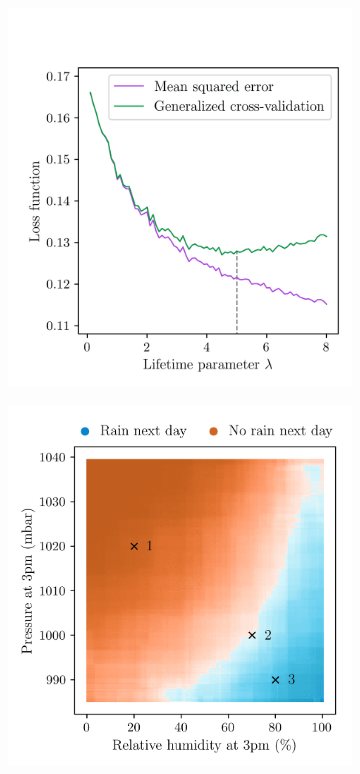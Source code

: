 \begin{figure}[ht]
  \centering
  \begin{subfigure}{0.49\textwidth}
    \centering
    \includegraphics[scale=0.64]{graphics/weather_gcv.png}%
  \end{subfigure}
  \begin{subfigure}{0.49\textwidth}
    \centering
    \includegraphics[scale=0.64]{graphics/weather_forest_design.png}%

\end{subfigure}
\end{figure}
